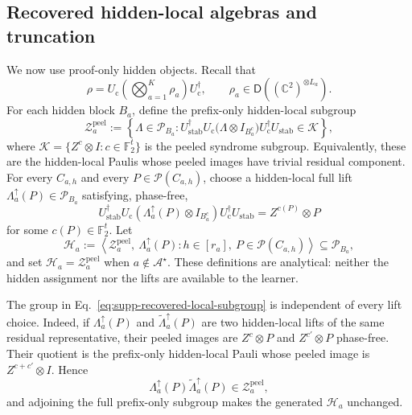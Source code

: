 \documentclass[
  aps,
  prx,
  reprint,
  superscriptaddress,
  amsmath,
  amssymb,
  nofootinbib,
  longbibliography
]{revtex4-2}
\newcommand{\D}{\mathsf{D}}
\newcommand{\Pc}{\mathcal{P}}
\newcommand{\Fc}{\mathbb{F}_2}
\begin{document}
\subsection{Recovered hidden-local algebras and truncation}
\label{sec:supp-hidden-local-truncation}

We now use proof-only hidden objects.  Recall that
\[
\rho
=
U_{\mathrm c}
\left(\bigotimes_{a=1}^K\rho_a\right)
U_{\mathrm c}^\dagger,
\qquad
\rho_a\in\D\!\left((\mathbb C^2)^{\otimes L_a}\right).
\]
For each hidden block $B_a$, define the prefix-only hidden-local subgroup
\begin{equation}
\mathcal Z_a^{\mathrm{peel}}
:=
\left\{
\Lambda\in\Pc_{B_a}:
U_{\mathrm{stab}}^\dagger
U_{\mathrm c}
\bigl(\Lambda\otimes I_{B_a^c}\bigr)
U_{\mathrm c}^\dagger
U_{\mathrm{stab}}
\in\mathcal K
\right\},
\label{eq:supp-prefix-only-local-subgroup}
\end{equation}
where
$\mathcal K=\{Z^c\otimes I:c\in\Fc^t\}$ is the peeled syndrome
subgroup.  Equivalently, these are the hidden-local Paulis whose peeled
images have trivial residual component.
For every $C_{a,h}$ and every $P\in\mathcal P(C_{a,h})$, choose a
hidden-local full lift
$\Lambda_a^\uparrow(P)\in\Pc_{B_a}$ satisfying, phase-free,
\begin{equation}
U_{\mathrm{stab}}^\dagger
U_{\mathrm c}
\left(\Lambda_a^\uparrow(P)\otimes I_{B_a^c}\right)
U_{\mathrm c}^\dagger
U_{\mathrm{stab}}
=
Z^{c(P)}\otimes P
\label{eq:supp-hidden-local-full-lift}
\end{equation}
for some $c(P)\in\Fc^t$.  Let
\begin{equation}
\mathcal H_a
:=
\left\langle
\mathcal Z_a^{\mathrm{peel}},\
\Lambda_a^\uparrow(P):
h\in[r_a],\ P\in\mathcal P(C_{a,h})
\right\rangle
\subseteq\Pc_{B_a},
\label{eq:supp-recovered-local-subgroup}
\end{equation}
and set $\mathcal H_a=\mathcal Z_a^{\mathrm{peel}}$ when
$a\notin\mathcal A^\star$.  These definitions are analytical: neither the
hidden assignment nor the lifts are available to the learner.

The group in Eq.~\eqref{eq:supp-recovered-local-subgroup} is independent
of every lift choice.  Indeed, if $\Lambda_a^\uparrow(P)$ and
$\widetilde{\Lambda}_a^\uparrow(P)$ are two hidden-local lifts of the same
residual representative, their peeled images are
$Z^c\otimes P$ and $Z^{c'}\otimes P$ phase-free.  Their quotient is the
prefix-only hidden-local Pauli whose peeled image is
$Z^{c+c'}\otimes I$.  Hence
\begin{equation}
\Lambda_a^\uparrow(P)\widetilde{\Lambda}_a^\uparrow(P)
\in\mathcal Z_a^{\mathrm{peel}},
\end{equation}
and adjoining the full prefix-only subgroup makes the generated
$\mathcal H_a$ unchanged.
\end{document}
